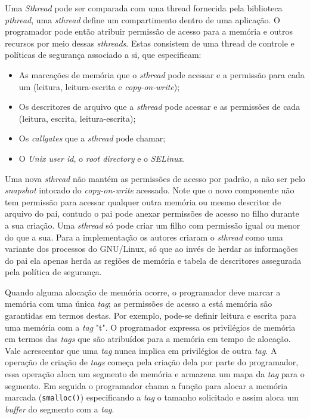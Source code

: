 Uma \emph{Sthread} pode ser comparada com uma thread fornecida pela biblioteca
\textit{pthread}, uma \textit{sthread} define um compartimento dentro de uma
aplicação. O programador pode então atribuir permissão de acesso para a memória
e outros recursos por meio dessas \emph{sthreads}. Estas consistem de uma
thread de controle e políticas de segurança associado a si, que especificam:

\begin{itemize}
	\item As marcações de memória que o \emph{sthread} pode acessar e a permissão
				para cada um (leitura, leitura-escrita e \textit{copy-on-write});
	\item Os descritores de arquivo que a \emph{sthread} pode acessar e as
				permissões de cada (leitura, escrita, leitura-escrita);
	\item Os \emph{callgates} que a \emph{sthread} pode chamar;
	\item O \emph{Unix user id}, o \emph{root directory} e o \emph{SELinux}.
\end{itemize}

Uma nova \emph{sthread} não mantém as permissões de acesso por padrão, a não
ser pelo \emph{snapshot} intocado do \emph{copy-on-write} acessado. Note que o
novo componente não tem permissão para acessar qualquer outra memória ou mesmo
descritor de arquivo do pai, contudo o pai pode anexar permissões de acesso no
filho durante a sua criação. Uma \emph{sthread} só pode criar um filho com
permissão igual ou menor do que a sua. Para a implementação os autores criaram
o \emph{sthread} como uma variante dos processos do GNU/Linux, só que ao invés
de herdar as informações do pai ela apenas herda as regiões de memória e tabela
de descritores assegurada pela política de segurança.

Quando alguma alocação de memória ocorre, o programador deve marcar a memória
com uma única \emph{tag}; as permissões de acesso a está memória são garantidas
em termos destas. Por exemplo, pode-se definir leitura e escrita para uma
memória com a \emph{tag} "t". O programador expressa os privilégios de memória
em termos das \emph{tags} que são atribuídos para a memória em tempo de
alocação. Vale acrescentar que uma \emph{tag} nunca implica em privilégios de
outra \emph{tag}. A operação de criação de \emph{tags} começa pela criação dela
por parte do programador, essa operação aloca um segmento de memória e armazena
um mapa da \emph{tag} para o segmento. Em seguida o programador chama a função
para alocar a memória marcada (\texttt{smalloc()}) especificando a \emph{tag} o
tamanho solicitado e assim aloca um \emph{buffer} do segmento com a \emph{tag}.

